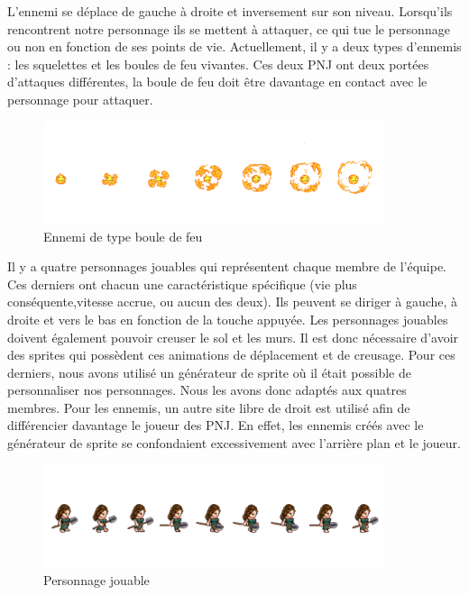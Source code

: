 \documentclass[a4paper,12pt]{article}
\begin{document}
L’ennemi se déplace de gauche à droite et inversement sur son niveau. 
Lorsqu’ils rencontrent notre personnage ils se mettent à attaquer, ce qui tue le personnage ou non en fonction de ses points de vie. 
Actuellement, il y a deux types d’ennemis : les squelettes et les boules de feu vivantes. 
Ces deux PNJ ont deux portées d’attaques différentes, la boule de feu doit être davantage en contact avec le personnage pour attaquer.

\begin{figure}[h]
	\centering
	\includegraphics[height=3cm]{img/exemple_feu.png}
	\caption{Ennemi de type boule de feu}
	\label{boule de feu}
\end{figure}

Il y a quatre personnages jouables qui représentent chaque membre de l’équipe. 
Ces derniers ont chacun une caractéristique spécifique (vie plus conséquente,vitesse accrue, ou aucun des deux). 
Ils peuvent se diriger à gauche, à droite et vers le bas en fonction de la touche appuyée. 
Les personnages jouables doivent également pouvoir creuser le sol et les murs. Il est donc nécessaire d’avoir des sprites qui possèdent ces animations de déplacement et de creusage.
Pour ces derniers, nous avons utilisé un générateur de sprite où il était possible de personnaliser nos personnages. Nous les avons donc adaptés aux quatres membres. 
Pour les ennemis, un autre site libre de droit est utilisé afin de différencier davantage le joueur des PNJ. En effet, les ennemis créés avec le générateur de sprite se confondaient excessivement avec l'arrière plan et le joueur.

\begin{figure}[h]
	\centering
	\includegraphics[height=3cm]{img/exemple_personnage_jouable.png}
	\caption{Personnage jouable}
	\label{personnage jouable}
\end{figure}
\end{document}
